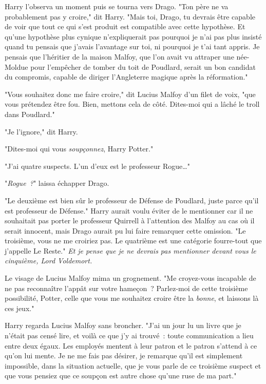 Harry l'observa un moment puis se tourna vers Drago. "Ton père ne va probablement pas y croire," dit Harry. "Mais toi, Drago, tu devrais être capable de voir que tout ce qui s'est produit est compatible avec cette hypothèse. Et qu'une hypothèse plus cynique n'expliquerait pas pourquoi je n'ai pas plus insisté quand tu pensais que j'avais l'avantage sur toi, ni pourquoi je t'ai tant appris. Je pensais que l'héritier de la maison Malfoy, que l'on avait vu attraper une née-Moldue pour l'empêcher de tomber du toit de Poudlard, serait un bon candidat du compromis, capable de diriger l'Angleterre magique après la réformation."

"Vous souhaitez donc me faire croire," dit Lucius Malfoy d'un filet de voix, "que vous prétendez être fou. Bien, mettons cela de côté. Dites-moi qui a lâché le troll dans Poudlard."

"Je l'ignore," dit Harry.

"Dites-moi qui vous \emph{soupçonnez}, Harry Potter."

"J'ai quatre suspects. L'un d'eux est le professeur Rogue…"

"\emph{Rogue~?}" laissa échapper Drago.

"Le deuxième est bien sûr le professeur de Défense de Poudlard, juste parce qu'il est professeur de Défense." Harry aurait voulu éviter de le mentionner car il ne souhaitait pas porter le professeur Quirrell à l'attention des Malfoy au cas où il serait innocent, mais Drago aurait pu lui faire remarquer cette omission. "Le troisième, vous ne me croiriez pas. Le quatrième est une catégorie fourre-tout que j'appelle Le Reste." \emph{Et je pense que je ne devrais pas mentionner devant vous le cinquième, Lord Voldemort.}

Le visage de Lucius Malfoy mima un grognement. "Me croyez-vous incapable de ne pas reconnaître l'appât sur votre hameçon~? Parlez-moi de cette troisième possibilité, Potter, celle que vous me souhaitez croire être la \emph{bonne}, et laissons là ces jeux."

Harry regarda Lucius Malfoy sans broncher. "J'ai un jour lu un livre que je n'était pas censé lire, et voilà ce que j'y ai trouvé~: toute communication a lieu entre deux égaux. Les employés mentent à leur patron et le patron s'attend à ce qu'on lui mente. Je ne me fais pas désirer, je remarque qu'il est simplement impossible, dans la situation actuelle, que je vous parle de ce troisième suspect et que vous pensiez que ce soupçon est autre chose qu'une ruse de ma part."

